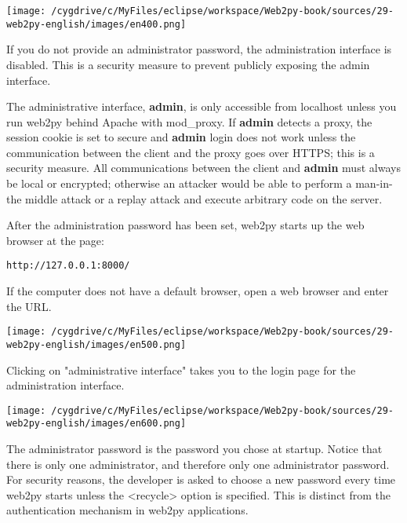 \documentclass[justified,sixbynine,notoc]{tufte-book}
\begin{document}
\begin{fullwidth}
\goodbreak\begin{center}\texttt{[image: /cygdrive/c/MyFiles/eclipse/workspace/Web2py-book/sources/29-web2py-english/images/en400.png]}\end{center}


If you do not provide an administrator password, the administration interface is disabled. This is a security measure to prevent publicly exposing the admin interface.

The administrative interface, {\bf admin}, is only accessible from localhost unless you run web2py behind Apache with mod\_proxy. If {\bf admin} detects a proxy, the session cookie is set to secure and {\bf admin} login does not work unless the communication between the client and the proxy goes over HTTPS; this is a security measure. All communications between the client and {\bf admin} must always be local or encrypted; otherwise an attacker would be able to perform a man-in-the middle attack or a replay attack and execute arbitrary code on the server.

After the administration password has been set, web2py starts up the web browser at the page:
\begin{lstlisting}[keywords={}]
http://127.0.0.1:8000/
\end{lstlisting}

If the computer does not have a default browser, open a web browser and enter the URL.


\goodbreak\begin{center}\texttt{[image: /cygdrive/c/MyFiles/eclipse/workspace/Web2py-book/sources/29-web2py-english/images/en500.png]}\end{center}


Clicking on "administrative interface" takes you to the login page for the administration interface.


\goodbreak\begin{center}\texttt{[image: /cygdrive/c/MyFiles/eclipse/workspace/Web2py-book/sources/29-web2py-english/images/en600.png]}\end{center}


The administrator password is the password you chose at startup.
Notice that there is only one administrator, and therefore only one administrator password. For security reasons, the developer is asked to choose a new password every time web2py starts unless the <recycle> option is specified. This is distinct from the authentication mechanism in web2py applications.


\end{fullwidth}
\end{document}
